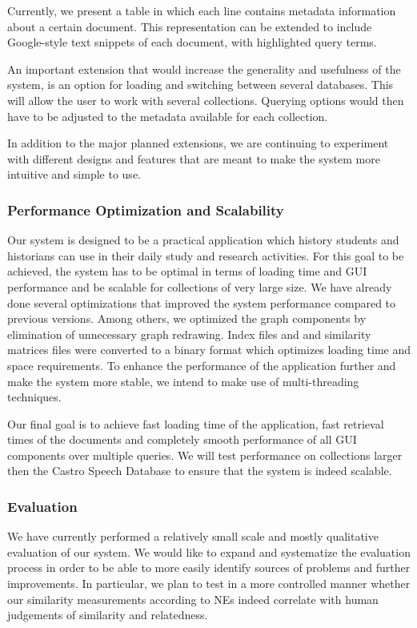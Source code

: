 Currently, we present a table in which each line contains metadata information about a certain document. This representation can be extended
to include Google-style text snippets of each document, with highlighted query terms.

An important extension that would increase the generality and usefulness of the system, 
is an option for loading and switching between several databases. This will allow the user to work with several collections. Querying options
would then have to be adjusted to the metadata available for each collection.

In addition to the major planned extensions, we are continuing to experiment with different designs and features that are meant to make the
system more intuitive and simple to use. 

\subsubsection{Performance Optimization and Scalability}
Our system is designed to be a practical application which history students and historians can use in their daily study and research activities.
For this goal to be achieved, the system has to be optimal in terms of loading time and GUI performance and be scalable for collections 
of very large size. We have already done several optimizations that improved the system performance compared to
previous versions. Among others, we optimized the graph components by elimination of unnecessary graph redrawing. 
Index files and and similarity matrices files were converted to a binary format which optimizes loading time and space requirements. 
To enhance the performance of the application further and make the system more stable, we intend to make use of multi-threading techniques. 

Our final goal is to achieve fast loading time of the application, fast retrieval times of the documents and completely 
smooth performance of all GUI components over multiple queries. We will test performance on collections larger then the Castro Speech Database to ensure
that the system is indeed scalable.    

\subsubsection{Evaluation}

We have currently performed a relatively small scale and mostly qualitative evaluation of our system. We would like to 
expand and systematize the evaluation process in order to be able to more easily identify sources of problems and further improvements.
In particular, we plan to test in a more controlled manner whether our similarity measurements according to NEs indeed correlate with human judgements of similarity and relatedness.   

